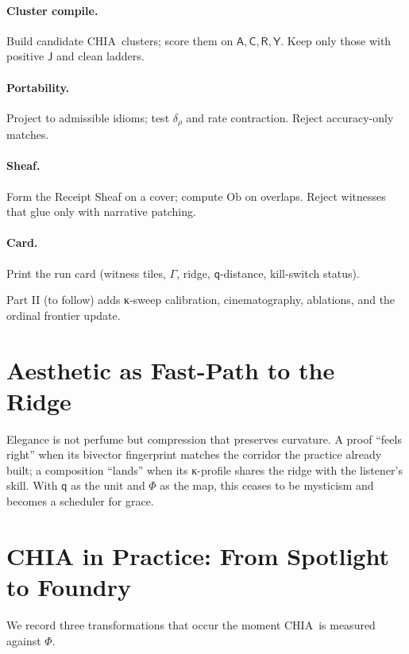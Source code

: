 \documentclass[11pt]{article}
\newcommand{\1}{\mathbf{1}}
\newcommand{\Guard}{\Gamma}
\newcommand{\ratio}{\rho}
\newcommand{\PhiField}{\Phi}
\newcommand{\Qualon}{\mathsf{q}}        %
\newcommand{\CHIA}{\textsc{CHIA}}
\newcommand{\Align}{\mathsf{A}}
\newcommand{\Compat}{\mathsf{C}}
\newcommand{\Rare}{\mathsf{R}}
\newcommand{\Yield}{\mathsf{Y}}
\newcommand{\Score}{\mathsf{J}}
\newcommand{\Ob}{\mathrm{Ob}}
\begin{document}
\paragraph{Cluster compile.} Build candidate \CHIA\ clusters; score them on \(\Align,\Compat,\Rare,\Yield\). Keep only those with positive \(\Score\) and clean ladders.

\paragraph{Portability.} Project to admissible idioms; test \(\delta_{\ratio}\) and rate contraction. Reject accuracy-only matches.

\paragraph{Sheaf.} Form the Receipt Sheaf on a cover; compute \(\Ob\) on overlaps. Reject witnesses that glue only with narrative patching.

\paragraph{Card.} Print the run card (witness tiles, \(\Guard\), ridge, \(\Qualon\)-distance, kill-switch status). 

\medskip

\noindent Part II (to follow) adds κ-sweep calibration, cinematography, ablations, and the ordinal frontier update.

\section{Aesthetic as Fast-Path to the Ridge}
Elegance is not perfume but compression that preserves curvature. A proof ``feels right'' when its bivector fingerprint matches the corridor the practice already built; a composition ``lands'' when its κ-profile shares the ridge with the listener's skill. With \(\Qualon\) as the unit and \(\PhiField\) as the map, this ceases to be mysticism and becomes a scheduler for grace.

\section{CHIA in Practice: From Spotlight to Foundry}
We record three transformations that occur the moment \CHIA\ is measured against \(\PhiField\).
\end{document}
